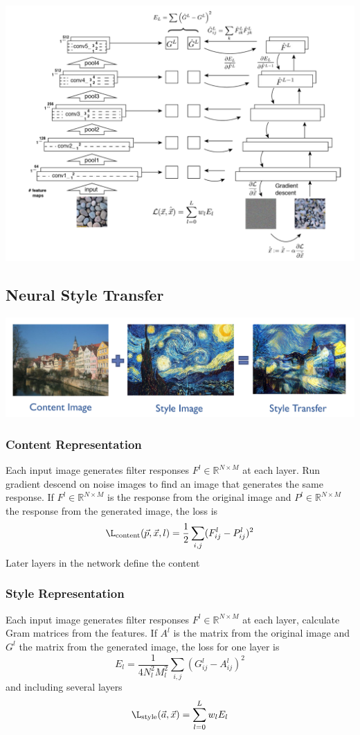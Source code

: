 \documentclass[11pt]{article}
\theoremstyle{definition}
\newcommand*\R{\mathbb{R}}
\begin{document}
\begin{center}
	\includegraphics[width=0.8\linewidth]{img/conditional_GAN_texture_generation}
\end{center}

\subsection{Neural Style Transfer}
\begin{center}
	\includegraphics[width=0.7\linewidth]{img/conditional_GAN_style_transfer}
\end{center}

\subsubsection{Content Representation}
Each input image generates filter responses $F^l \in \R^{N\times M}$ at each layer. Run gradient descend on noise images to find an image that generates the same response. If $F^l \in \R^{N\times M}$ is the response from the original image and $P^l \in \R^{N\times M}$ the response from the generated image, the loss is
\begin{equation*}
	\L_{\text{content}}(\vec{p},\vec{x},l) = \frac{1}{2} \sum_{i,j} (F_{ij}^l - P_{ij}^l)^2
\end{equation*}
Later layers in the network define the content

\subsubsection{Style Representation}
Each input image generates filter responses $F^l \in \R^{N\times M}$ at each layer, calculate Gram matrices from the features. If $A^l$ is the matrix from the original  image and $G^l$ the matrix from the generated image, the loss for one layer is
\begin{equation*}
	E_l = \frac{1}{4 N_l^2 M_l^2}\sum_{i,j}(G_{ij}^l - A_{ij}^l)^2
\end{equation*}
and including several layers
\begin{equation*}
	\L_{\text{style}}(\vec{a},\vec{x}) = \sum_{l=0}^{L}w_l E_l
\end{equation*}
\end{document}

